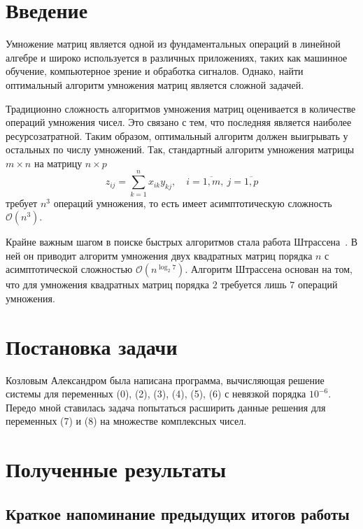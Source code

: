 \documentclass[12pt]{article}
\begin{document}
    \prPutTitleContents


    \section{Введение}

    Умножение матриц является одной из фундаментальных операций в линейной алгебре и широко используется в различных
    приложениях, таких как машинное обучение, компьютерное зрение и обработка сигналов.
    Однако, найти оптимальный алгоритм умножения матриц является сложной задачей.

    Традиционно сложность алгоритмов умножения матриц оценивается в количестве операций умножения чисел.
    Это связано с тем, что последняя является наиболее ресурсозатратной.
    Таким образом, оптимальный алгоритм должен выигрывать у остальных по числу умножений.
    Так, стандартный алгоритм умножения матрицы $ m \times n $ на матрицу $ n \times p $
    \begin{equation}
        z_{ij} = \sum_{k=1}^{n} x_{ik} y_{kj},
        \quad i = \overline{1,m}, \: j = \overline{1,p}\label{eq:1}
    \end{equation}
    требует $ n^3 $ операций умножения, то есть имеет асимптотическую сложность $ \mathcal{O}(n^3) $.

    Крайне важным шагом в поиске быстрых алгоритмов стала работа Штрассена~\cite{strassen}.
    В ней он приводит алгоритм умножения двух квадратных матриц порядка $ n $ с асимптотической сложностью
    $ \mathcal{O}(n^{\log_2 7}) $.
    Алгоритм Штрассена основан на том, что для умножения квадратных матриц порядка $ 2 $ требуется лишь $ 7 $ операций
    умножения.


    \section{Постановка задачи}

    Козловым Александром была написана программа, вычисляющая решение системы для переменных (0), (2), (3), (4), (5),
    (6) с невязкой порядка $ 10^{-6} $.
    Передо мной ставилась задача попытаться расширить данные решения для переменных (7) и (8) на множестве комплексных
    чисел.


    \section{Полученные результаты}

    \subsection{Краткое напоминание предыдущих итогов работы}
\end{document}
